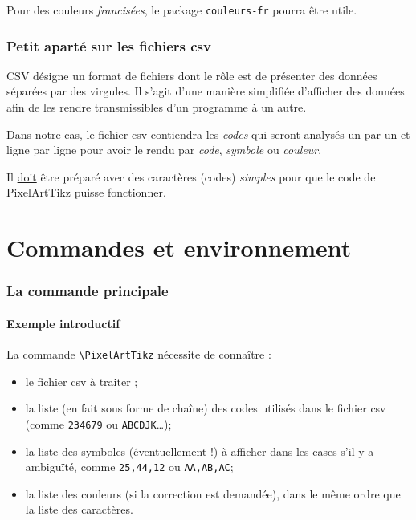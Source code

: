 \documentclass{article}
\begin{document}
\smallskip

Pour des couleurs \textit{francisées}, le package \texttt{couleurs-fr} pourra être utile.

\section{Petit aparté sur les fichiers csv}

\textsf{CSV} désigne un format de fichiers dont le rôle est de présenter des données séparées par des virgules. Il s'agit d'une manière simplifiée d'afficher des données afin de les rendre transmissibles d'un programme à un autre.

\smallskip

Dans notre cas, le fichier \textsf{csv} contiendra les \textit{codes} qui seront analysés un par un et ligne par ligne pour avoir le rendu par \textit{code}, \textit{symbole} ou \textit{couleur}.

\medskip

Il \underline{doit} être préparé avec des caractères (codes) \textit{simples} pour que le code de \textsf{PixelArtTikz} puisse fonctionner.

\pagebreak

\part{Commandes et environnement}

\section{La commande principale}

\subsection{Exemple introductif}

La commande \texttt{\textbackslash PixelArtTikz} nécessite de connaître :

\begin{itemize}
	\item le fichier \textsf{csv} à traiter ;
	\item la liste (en fait sous forme de chaîne) des codes utilisés dans le fichier \textsf{csv} (comme \texttt{234679} ou \texttt{ABCDJK}\ldots);
	\item la liste des symboles (éventuellement !) à afficher dans les cases s'il y a ambiguïté, comme \texttt{25,44,12} ou \texttt{AA,AB,AC};
	\item la liste des couleurs (si la correction est demandée), dans le même ordre que la liste des caractères.
\end{itemize}
\end{document}
